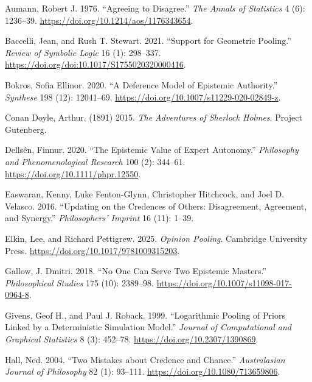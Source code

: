\documentclass[
  11pt,
  letterpaper,
  DIV=11,
  numbers=noendperiod,
  twoside]{scrartcl}
\newlength{\cslhangindent}
\newenvironment{CSLReferences}[2] %
 {\begin{list}{}{%
  \setlength{\itemindent}{0pt}
  \setlength{\leftmargin}{0pt}
  \setlength{\parsep}{0pt}
  \ifodd #1
   \setlength{\leftmargin}{\cslhangindent}
   \setlength{\itemindent}{-1\cslhangindent}
  \fi
  \setlength{\itemsep}{#2\baselineskip}}}
 {\end{list}}
\begin{document}
\protect{}\label{refs}
\begin{CSLReferences}{1}{1}
Aumann, Robert J. 1976. {``Agreeing to Disagree.''} \emph{The Annals of
Statistics} 4 (6): 1236--39.
\url{https://doi.org/10.1214/aos/1176343654}.

Baccelli, Jean, and Rush T. Stewart. 2021. {``Support for Geometric
Pooling.''} \emph{Review of Symbolic Logic} 16 (1): 298--337.
\url{https://doi.org/doi:10.1017/S1755020320000416}.

Bokros, Sofia Ellinor. 2020. {``A Deference Model of Epistemic
Authority.''} \emph{Synthese} 198 (12): 12041--69.
\url{https://doi.org/10.1007/s11229-020-02849-z}.

Conan Doyle, Arthur. (1891) 2015. \emph{The Adventures of Sherlock
Holmes}. Project Gutenberg.

Dellsén, Finnur. 2020. {``The Epistemic Value of Expert Autonomy.''}
\emph{Philosophy and Phenomenological Research} 100 (2): 344--61.
\url{https://doi.org/10.1111/phpr.12550}.

Easwaran, Kenny, Luke Fenton-Glynn, Christopher Hitchcock, and Joel D.
Velasco. 2016. {``Updating on the Credences of Others: Disagreement,
Agreement, and Synergy.''} \emph{Philosophers' Imprint} 16 (11): 1--39.

Elkin, Lee, and Richard Pettigrew. 2025. \emph{Opinion Pooling}.
Cambridge University Press. \url{https://doi.org/10.1017/9781009315203}.

Gallow, J. Dmitri. 2018. {``No One Can Serve Two Epistemic Masters.''}
\emph{Philosophical Studies} 175 (10): 2389--98.
\url{https://doi.org/10.1007/s11098-017-0964-8}.

Givens, Geof H., and Paul J. Roback. 1999. {``Logarithmic Pooling of
Priors Linked by a Deterministic Simulation Model.''} \emph{Journal of
Computational and Graphical Statistics} 8 (3): 452--78.
\url{https://doi.org/10.2307/1390869}.

Hall, Ned. 2004. {``Two Mistakes about Credence and Chance.''}
\emph{Australasian Journal of Philosophy} 82 (1): 93--111.
\url{https://doi.org/10.1080/713659806}.


\end{CSLReferences}
\end{document}
